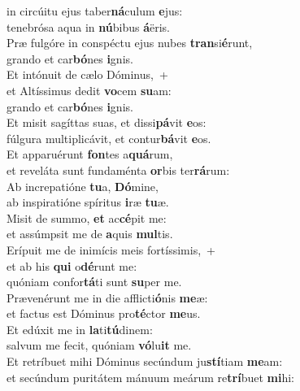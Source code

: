 \oddverse  in circúitu ejus taber\textbf{ná}culum \textbf{e}jus:~\*\\
\oddverse tenebrósa aqua in \textbf{nú}bibus \textbf{á}ëris.\\
\evenverse Præ fulgóre in conspéctu ejus nubes \textbf{tran}si\textbf{é}runt,~\*\\
\evenverse grando et car\textbf{bó}nes \textbf{i}gnis.\\
\oddverse Et intónuit de cælo Dóminus,~+\\
\oddverse  et Altíssimus dedit \textbf{vo}cem \textbf{su}am:~\*\\
\oddverse grando et car\textbf{bó}nes \textbf{i}gnis.\\
\evenverse Et misit sagíttas suas, et dissi\textbf{pá}vit \textbf{e}os:~\*\\
\evenverse fúlgura multiplicávit, et contur\textbf{bá}vit \textbf{e}os.\\
\oddverse Et apparuérunt \textbf{fon}tes a\textbf{quá}rum,~\*\\
\oddverse et reveláta sunt fundaménta \textbf{or}bis ter\textbf{rá}rum:\\
\evenverse Ab increpatióne \textbf{tu}a, \textbf{Dó}mine,~\*\\
\evenverse ab inspiratióne spíritus \textbf{i}ræ \textbf{tu}æ.\\
\oddverse Misit de summo, \textbf{et} ac\textbf{cé}pit me:~\*\\
\oddverse et assúmpsit me de \textbf{a}quis \textbf{mul}tis.\\
\evenverse Erípuit me de inimícis meis fortíssimis,~+\\
\evenverse  et ab his \textbf{qui} o\textbf{dé}runt me:~\*\\
\evenverse quóniam confor\textbf{tá}ti sunt \textbf{su}per me.\\
\oddverse Prævenérunt me in die afflicti\textbf{ó}nis \textbf{me}æ:~\*\\
\oddverse et factus est Dóminus pro\textbf{té}ctor \textbf{me}us.\\
\evenverse Et edúxit me in \textbf{la}ti\textbf{tú}dinem:~\*\\
\evenverse salvum me fecit, quóniam \textbf{vó}lu\textbf{it} me.\\
\oddverse Et retríbuet mihi Dóminus secúndum ju\textbf{stí}tiam \textbf{me}am:~\*\\
\oddverse et secúndum puritátem mánuum meárum re\textbf{trí}buet \textbf{mi}hi:\\
